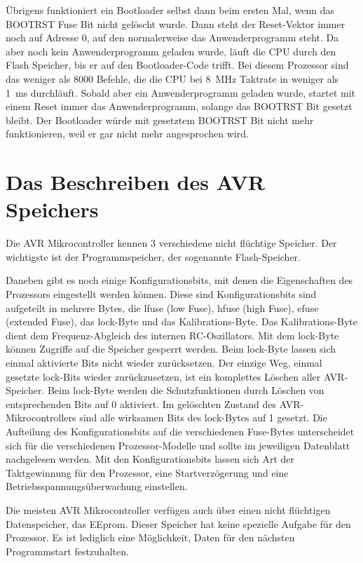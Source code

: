 Übrigens funktioniert ein Bootloader selbst dann beim ersten Mal, wenn
das BOOTRST Fuse Bit nicht gelöscht wurde. Dann steht der Reset-Vektor
immer noch auf Adresse 0, auf den normalerweise das Anwenderprogramm steht.
Da aber noch kein Anwenderprogramm geladen wurde, läuft die CPU
durch den Flash Speicher, bis er auf den Bootloader-Code trifft.
Bei diesem Prozessor sind das weniger als 8000 Befehle, die die CPU bei
8~MHz Taktrate in weniger als 1~ms durchläuft.
Sobald aber ein Anwenderprogramm geladen wurde, startet mit einem Reset
immer das Anwenderprogramm, solange das BOOTRST Bit gesetzt bleibt.
Der Bootloader würde mit gesetztem BOOTRST Bit nicht mehr funktionieren,
weil er gar nicht mehr angesprochen wird.


\section{Das Beschreiben des AVR Speichers}

Die AVR Mikrocontroller kennen 3 verschiedene nicht flüchtige Speicher.
Der wichtigste ist der Programmspeicher, der sogenannte Flash-Speicher.


Daneben gibt es noch einige Konfigurationsbits, mit denen die Eigenschaften
des Prozessors eingestellt werden können.
Diese sind Konfigurationsbits sind aufgeteilt in mehrere Bytes, die lfuse (low Fuse),
hfuse (high Fuse), efuse (extended Fuse), das lock-Byte und das Kalibrations-Byte.
Das Kalibrations-Byte dient dem Frequenz-Abgleich des internen RC-Oszillators.
Mit dem lock-Byte können Zugriffe auf die Speicher gesperrt werden.
Beim lock-Byte lassen sich einmal aktivierte Bits nicht wieder zurücksetzen.
Der einzige Weg, einmal gesetzte lock-Bits wieder zurückzusetzen, ist ein komplettes
Löschen aller AVR-Speicher. Beim lock-Byte werden die Schutzfunktionen durch Löschen 
von entsprechenden Bits auf 0 aktiviert.
Im gelöschten Zustand des AVR-Mikrocontrollers sind alle wirksamen Bits des lock-Bytes auf 1 gesetzt.
Die Aufteilung des Konfigurationsbits auf die verschiedenen Fuse-Bytes unterscheidet
sich für die verschiedenen Prozessor-Modelle und sollte im jeweiligen Datenblatt nachgelesen werden.
Mit den Konfigurationsbits lassen sich Art der Taktgewinnung für den Prozessor, eine
Startverzögerung und eine Betriebsspannungsüberwachung einstellen.


Die meisten AVR Mikrocontroller verfügen auch über einen nicht flüchtigen Datenspeicher,
das EEprom. Dieser Speicher hat keine spezielle Aufgabe für den Prozessor. Es ist lediglich
eine Möglichkeit, Daten für den nächsten Programmstart festzuhalten.

